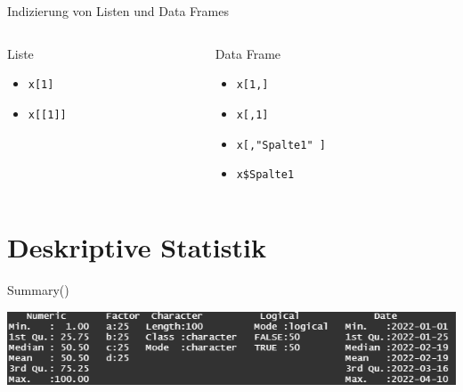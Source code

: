\documentclass[aspectratio = 169]{chariteBeamer}
\begin{document}
\begin{frame}[fragile]{Indizierung von Listen und Data Frames}
	
	\begin{columns}[T]
	\begin{column}{0.5\textwidth}
Liste
		\begin{itemize}
		\item \verb+x[1]+
		\item \verb+x[[1]]+
	\end{itemize}
	\end{column}
	\begin{column}{0.5\textwidth}
Data Frame
	\begin{itemize}
		\item  \verb+x[1,]+
		\item  \verb+x[,1]+
		\item  \verb+x[,"Spalte1" ]+
		\item  \verb+x$Spalte1+
	\end{itemize}
	\end{column}
\end{columns}

\end{frame}

\section{Deskriptive Statistik}

\begin{frame}{Summary()}
	\begin{center}
		\includegraphics[scale=0.9]{Summary}
	\end{center}
\end{frame}
\end{document}
